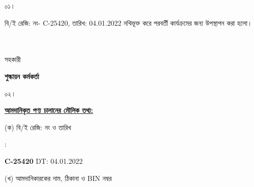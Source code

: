 \documentclass[12pt]{article}
\newcommand{\beno}{C-25420}
\newcommand{\bedt}{04.01.2022}
\begin{document}
\noindent
\begin{minipage}[t]{0.05\linewidth}
০১।
\end{minipage}
\begin{minipage}[t]{0.95\linewidth}
বি/ই রেজি: নং- {\beno}, তারিখ: {\bedt}
নথিভূক্ত করে
পরবর্তী কার্যক্রমের জন্য উপস্থাপন করা হলো।
\\
\\
\\
\end{minipage}
\begin{minipage}[t]{0.05\linewidth}
\hspace*{0em}
\end{minipage}
\begin{minipage}[t]{0.05\linewidth}
সহকারী
\end{minipage}
\begin{minipage}[t]{0.37\linewidth}
\hspace{0em}
\end{minipage}
\begin{minipage}[t]{0.53\linewidth}
\textbf{শুল্কায়ন কর্মকর্তা}
\\
\end{minipage}
\begin{minipage}[t]{0.05\linewidth}
০২।
\end{minipage}
\begin{minipage}[t]{0.95\linewidth}
\underline{\textbf {আমদানিকৃত পণ্য চালানের
মৌলিক তথ্য:}}
\\
\end{minipage}
\footnotesize
\begin{minipage}[t]{0.05\linewidth}
\hspace*{1em}
\end{minipage}
\begin{minipage}[t]{0.40\linewidth}
(ক) বি/ই রেজি: নং ও তারিখ
\end{minipage}
\begin{minipage}[t]{0.02\linewidth}
:
\end{minipage}
\begin{minipage}[t]{0.53\linewidth}
\textbf{{\beno}} \hspace{2em} DT: {\bedt}
\\
\end{minipage}
\begin{minipage}[t]{0.05\linewidth}
\hspace*{1em}
\end{minipage}
\begin{minipage}[t]{0.40\linewidth}
(খ) আমদানিকারকের নাম, ঠিকানা
ও BIN নম্বর
\end{minipage}
\end{document}
